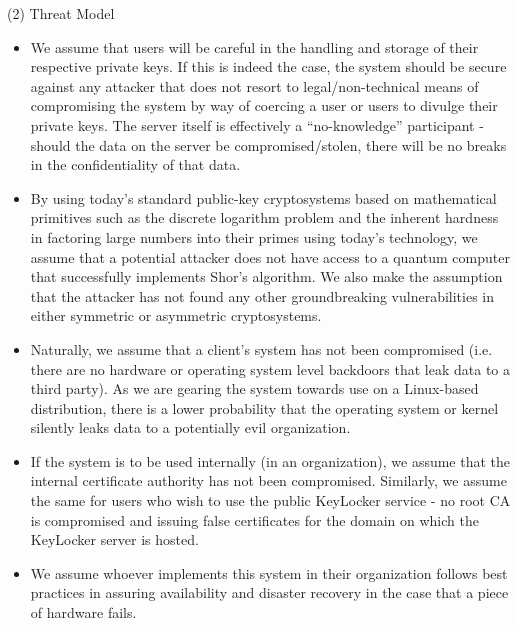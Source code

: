 \documentclass[11pt, letterpaper]{article}
\begin{document}
\noindent(2) Threat Model
\begin{itemize} \itemsep1pt \parskip0pt 
\item We assume that users will be careful in the handling and storage of their respective private keys. If this is indeed the case, the system should be secure against any attacker that does not resort to legal/non-technical means of compromising the system by way of coercing a user or users to divulge their private keys. The server itself is effectively a “no-knowledge” participant - should the data on the server be compromised/stolen, there will be no breaks in the confidentiality of that data.
\item By using today’s standard public-key cryptosystems based on mathematical primitives such as the discrete logarithm problem and the inherent hardness in factoring large numbers into their primes using today’s technology, we assume that a potential attacker does not have access to a quantum computer that successfully implements Shor’s algorithm. We also make the assumption that the attacker has not found any other groundbreaking vulnerabilities in either symmetric or asymmetric cryptosystems.
\item Naturally, we assume that a client’s system has not been compromised (i.e. there are no hardware or operating system level backdoors that leak data to a third party). As we are gearing the system towards use on a Linux-based distribution, there is a lower probability that the operating system or kernel silently leaks data to a potentially evil organization.
\item If the system is to be used internally (in an organization), we assume that the internal certificate authority has not been compromised. Similarly, we assume the same for users who wish to use the public KeyLocker service - no root CA is compromised and issuing false certificates for the domain on which the KeyLocker server is hosted.
\item We assume whoever implements this system in their organization follows best practices in assuring availability and disaster recovery in the case that a piece of hardware fails.
\end{itemize}
\end{document}
